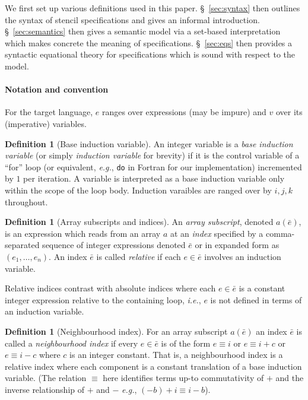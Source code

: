 \documentclass[10pt,preprint]{sigplanconf}
\newcounter{block}
\theoremstyle{definition}
\newtheorem{definition}[block]{Definition}
\newcommand{\ie}{\emph{i.e.}}
\newcommand{\eg}{\emph{e.g.}}
\begin{document}
We first set up various definitions used in this paper.
\S~\ref{sec:syntax} then outlines the syntax of stencil specifications
and gives an informal introduction. \S~\ref{sec:semantics} then
gives a semantic model via a set-based interpretation which makes
concrete the meaning of specifications. \S~\ref{sec:eqs} then provides
a syntactic equational theory for specifications which is
sound with respect to the model.


\paragraph{Notation and convention}

\renewcommand*{\arraystretch}{0.8}
For the target language, $e$ ranges over expressions (may be impure) and $v$
over its (imperative) variables. %

\begin{definition}[Base induction variable]
  An integer variable is a \emph{base induction variable} (or simply
\emph{induction variable} for brevity) if it is the
  control variable of a ``for'' loop (or equivalent, \eg{},
  \texttt{do} in Fortran for our implementation) incremented by $1$
  per iteration. A variable is interpreted as a base induction
variable only within the scope of the loop body. Induction varaibles
are ranged over by $i, j, k$ throughout.
\end{definition}

\begin{definition}[Array subscripts and indices]
  An \emph{array subscript}, denoted $a(\bar{e})$, is an expression
  which reads from an array $a$ at an \emph{index} specified by a
  comma-separated sequence of integer expressions denoted $\bar{e}$ or
  in expanded form as $(e_1, \ldots, e_n)$. An index $\bar{e}$
  is called \emph{relative} if each $e \in \bar{e}$ involves an induction variable.

  Relative indices contrast with absolute indices where each $e \in
  \bar{e}$ is a constant integer expression relative to the containing
  loop, \ie{}, $e$ is not defined in terms of an induction variable.
\end{definition}

\begin{definition}[Neighbourhood index]
\label{def:neighbour}
  For an array subscript $a(\bar{e})$ an index $\bar{e}$ is called a
  \emph{neighbourhood index} if every $e \in \bar{e}$ is of the form
  $e \equiv i$ or $e \equiv i + c$ or $e \equiv i - c$ where $c$ is an
  integer constant. That is, a neighbourhood index is a relative index
  where each component is a constant translation of a base induction
  variable. (The relation $\equiv$ here identifies terms up-to
  commutativity of $+$ and the inverse relationship of $+$ and $-$
  \eg{}, $(-b) + i \equiv i - b$).
\end{definition}
\end{document}

